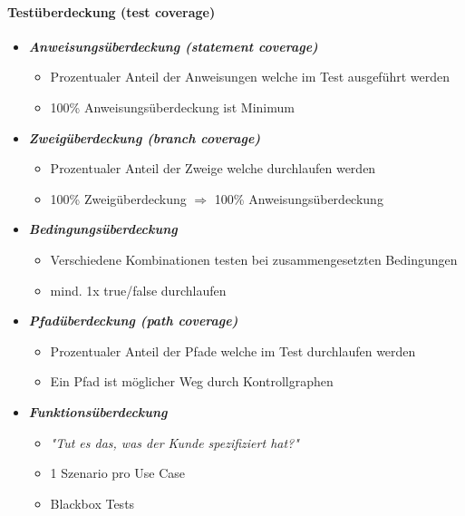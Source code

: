 \paragraph{Testüberdeckung (test coverage)}
\begin{itemize}
	\item \textbf{\textit{Anweisungsüberdeckung (statement coverage)}}
			\begin{itemize}
				\item Prozentualer Anteil der Anweisungen welche im Test ausgeführt werden
				\item 100\% Anweisungsüberdeckung ist Minimum
			\end{itemize}
	\item \textbf{\textit{Zweigüberdeckung (branch coverage)}}
			\begin{itemize}
				\item Prozentualer Anteil der Zweige welche durchlaufen werden
				\item 100\% Zweigüberdeckung $\Rightarrow$ 100\% Anweisungsüberdeckung
			\end{itemize}
	\item \textbf{\textit{Bedingungsüberdeckung}}
			\begin{itemize}
				\item Verschiedene Kombinationen testen bei zusammengesetzten Bedingungen
				\item mind. 1x true/false durchlaufen
			\end{itemize}
	\item \textbf{\textit{Pfadüberdeckung (path coverage)}}
			\begin{itemize}
				\item Prozentualer Anteil der Pfade welche im Test durchlaufen werden
				\item Ein Pfad ist möglicher Weg durch Kontrollgraphen
			\end{itemize}
	\item \textbf{\textit{Funktionsüberdeckung}}
			\begin{itemize}
				\item \textit{"{}Tut es das, was der Kunde spezifiziert hat?"}
				\item 1 Szenario pro Use Case 
				\item Blackbox Tests
			\end{itemize}
\end{itemize}

